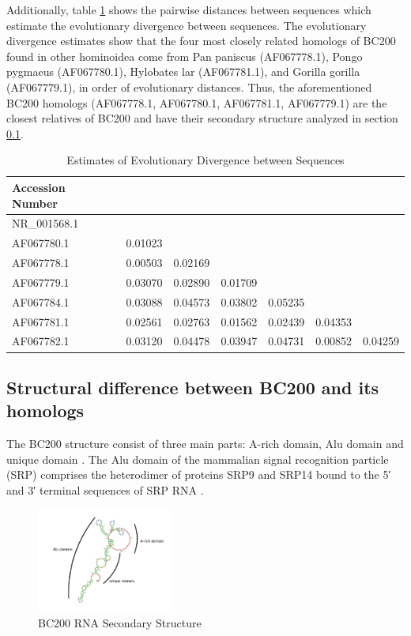 \documentclass[conference, 11pt]{IEEEtran}
\begin{document}
Additionally, table \ref{tbl:distances} shows the pairwise distances between sequences which estimate the evolutionary divergence between sequences. 
The evolutionary divergence estimates show that the four most closely related homologs of BC200 found in other hominoidea come from Pan paniscus (AF067778.1), Pongo pygmaeus (AF067780.1), Hylobates lar (AF067781.1), and Gorilla gorilla (AF067779.1), in order of evolutionary distances. 
Thus, the aforementioned BC200 homologs (AF067778.1, AF067780.1, AF067781.1, AF067779.1) are the closest relatives of BC200 and have their secondary structure analyzed in section \ref{sec:results-structure}.

\begin{table}[h]
  \centering
  \caption{Estimates of Evolutionary Divergence between Sequences}
  \label{tbl:distances}
  \begin{tabular}{lcccccc}
    \toprule
    Accession Number \\
    \midrule
    NR\_001568.1 \\
    AF067780.1 & 0.01023 \\
    AF067778.1 & 0.00503 & 0.02169 \\
    AF067779.1 & 0.03070 & 0.02890 & 0.01709 \\ 
    AF067784.1 & 0.03088 & 0.04573 & 0.03802 & 0.05235 \\
    AF067781.1 & 0.02561 & 0.02763 & 0.01562 & 0.02439 & 0.04353 \\ 
    AF067782.1 & 0.03120 & 0.04478 & 0.03947 & 0.04731 & 0.00852 & 0.04259 \\
    \bottomrule
  \end{tabular}
\end{table}

\subsection{Structural difference between BC200 and its homologs}\label{sec:results-structure}

The BC200 structure consist of three main parts: A-rich domain, Alu domain and unique domain \cite{jung2014rna}.
The Alu domain of the mammalian signal recognition particle (SRP) comprises the heterodimer of proteins SRP9 and SRP14 bound to the 5′ and 3′ terminal sequences of SRP RNA \cite{weichenrieder2000structure}. 
\begin{figure}[h]
  \centering
  \includegraphics[width=0.4\textwidth]{figs/rna-6.png}
  \caption{BC200 RNA Secondary Structure}
  \label{fig:bc200-structure}
\end{figure}
\end{document}
